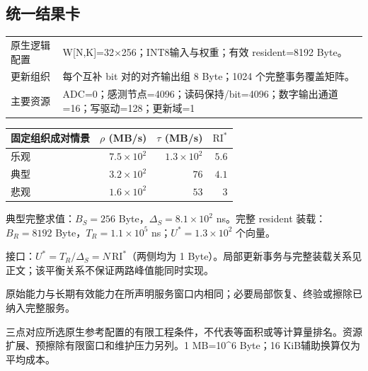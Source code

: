 \subsection*{统一结果卡}
\begingroup\small
\noindent\begin{tabularx}{\textwidth}{@{}p{24mm}X@{}}\toprule
原生逻辑配置 & W[N,K]=32×256；INT8输入与权重；有效 resident=8192 Byte。\\
更新组织 & 每个互补 bit 对的对齐输出组 8 Byte；1024 个完整事务覆盖矩阵。\\
主要资源 & ADC=0；感测节点=4096；读码保持/bit=4096；数字输出通道=16；写驱动=128；更新域=1\\
\bottomrule\end{tabularx}
\vspace{3mm}
\begin{center}\begin{tabular}{@{}lrrr@{}}\toprule
固定组织成对情景 & $\rho$ (MB/s) & $\tau$ (MB/s) & $\mathrm{RI}^{*}$\\\midrule
乐观 & $7.5\times10^{2}$ & $1.3\times10^{2}$ & $5.6$\\
典型 & $3.2\times10^{2}$ & $76$ & $4.1$\\
悲观 & $1.6\times10^{2}$ & $53$ & $3$\\
\bottomrule\end{tabular}\end{center}
\noindent 典型完整求值：$B_S=256$ Byte，$\Delta_S=8.1\times10^{2}$ ns。完整 resident 装载：$B_R=8192$ Byte，$T_R=1.1\times10^{5}$ ns；$U^*=1.3\times10^{2}$ 个向量。
\par\smallskip\noindent 接口：$U^*=T_R/\Delta_S=N\,\mathrm{RI}^*$（两侧均为 1 Byte）。局部更新事务与完整装载关系见正文；该平衡关系不保证两路峰值能同时实现。
\par\smallskip\noindent 原始能力与长期有效能力在所声明服务窗口内相同；必要局部恢复、终验或擦除已纳入完整服务。
\par\smallskip\noindent 三点对应所选原生参考配置的有限工程条件，不代表等面积或等计算量排名。资源扩展、预擦除有限窗口和维护压力另列。1 MB=10\textasciicircum{}6 Byte；16 KiB辅助换算仅为平均成本。
\endgroup
\clearpage
